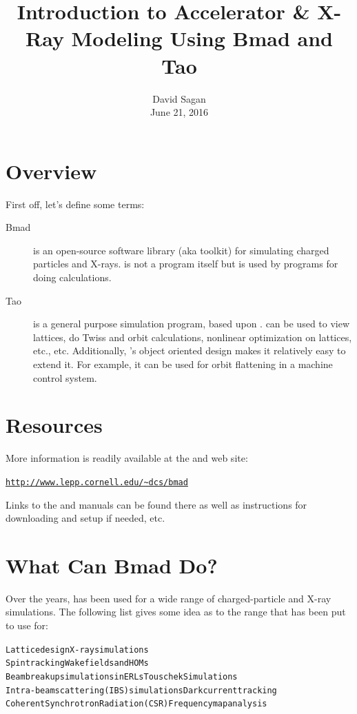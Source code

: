 \documentclass{hitec}
\title{Introduction to Accelerator \& X-Ray Modeling Using Bmad and Tao}
\author{}
\date{David Sagan \\ June 21, 2016}
\newcommand{\Section}[1]{\section{#1}\vspace*{-1ex}}
\newenvironment{display}
  {\vspace*{-1.5ex} \begin{alltt}}
  {\end{alltt} \vspace*{-1.0ex}}
\begin{document}
\maketitle

\tableofcontents

\Section{Overview}

First off, let's define some terms:
  \begin{description}
  \item[Bmad] \Newline
\bmad is an open-source software library (aka toolkit) for simulating charged particles
and X-rays. \bmad is not a program itself but is used by programs for doing
calculations. 
  \item[Tao] \Newline
\tao is a general purpose simulation program, based upon \bmad. \tao can be used to view
lattices, do Twiss and orbit calculations, nonlinear optimization on lattices, etc., etc.
Additionally, \tao's object oriented design makes it relatively easy to extend it. For
example, it can be used for orbit flattening in a machine control system.
  \end{description}

\Section{Resources}

More information is readily available at the \bmad and \tao web site:
\begin{display}
  \url{http://www.lepp.cornell.edu/~dcs/bmad}
\end{display}
Links to the \bmad and \tao manuals can be found there as well as instructions for
downloading and setup if needed, etc.

\Section{What Can Bmad Do?}

Over the years, \bmad has been used for a wide range of charged-particle and X-ray
simulations. The following list gives some idea as to the range that \bmad has been put to use
for:
\begin{display}
  Lattice design                              X-ray simulations
  Spin tracking                               Wakefields and HOMs
  Beam breakup simulations in ERLs            Touschek Simulations
  Intra-beam scattering (IBS) simulations     Dark current tracking
  Coherent Synchrotron Radiation (CSR)        Frequency map analysis
\end{display}
\end{document}

